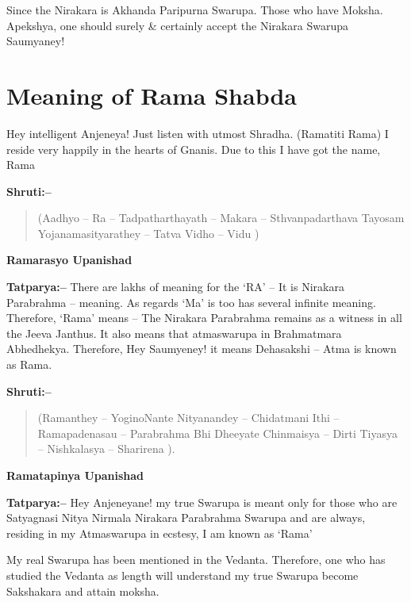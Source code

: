 Since the Nirakara is Akhanda Paripurna Swarupa. Those who have Moksha. Apekshya, one should surely \& certainly accept the Nirakara Swarupa Saumyaney!

\chapter{Meaning of Rama Shabda}

Hey intelligent Anjeneya! Just listen with utmost Shradha. (Ramatiti Rama) I reside very happily in the hearts of Gnanis. Due to this I have got the name, Rama

\textbf{Shruti:–}

\begin{verse}
(Aadhyo – Ra – Tadpatharthayath – Makara – Sthvanpadarthava  Tayosam Yojanamasityarathey – Tatva Vidho – Vidu )
\end{verse}

\begin{flushright}
\textbf{Ramarasyo Upanishad}
\end{flushright}

\textbf{Tatparya:–} There are lakhs of meaning for the ‘RA’ – It is Nirakara Parabrahma – meaning. As regards ‘Ma’ is too has several infinite meaning. Therefore, ‘Rama’ means – The Nirakara Parabrahma remains as a witness in all the Jeeva Janthus. It also means that atmaswarupa in Brahmatmara Abhedhekya. Therefore, Hey Saumyeney! it means Dehasakshi – Atma is known as Rama.

\textbf{Shruti:–}

\begin{verse}
(Ramanthey – YoginoNante Nityanandey – Chidatmani  Ithi – Ramapadenasau – Parabrahma Bhi Dheeyate  Chinmaisya – Dirti Tiyasya – Nishkalasya – Sharirena ).
\end{verse}

\begin{flushright}
\textbf{Ramatapinya Upanishad}
\end{flushright}

\textbf{Tatparya:–} Hey Anjeneyane! my true Swarupa is meant only for those who are Satyagnasi Nitya Nirmala Nirakara Parabrahma Swarupa and are always, residing in my Atmaswarupa in ecstesy, I am known as ‘Rama’

My real Swarupa has been mentioned in the Vedanta. Therefore, one who has studied the Vedanta as length will understand my true Swarupa become Sakshakara and attain moksha.

